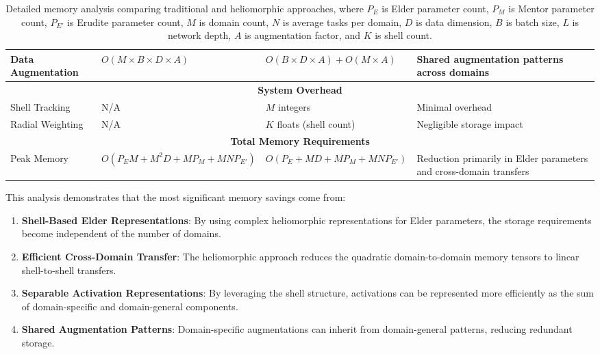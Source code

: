 \begin{table}[h]
\begin{tabular}{|p{3.5cm}|p{3.5cm}|p{3.5cm}|p{3.5cm}|}
\hline
Data Augmentation & $O(M \times B \times D \times A)$ & $O(B \times D \times A) + O(M \times A)$ & Shared augmentation patterns across domains \\
\hline
\multicolumn{4}{|c|}{\textbf{System Overhead}} \\
\hline
Shell Tracking & N/A & $M$ integers & Minimal overhead \\
\hline
Radial Weighting & N/A & $K$ floats (shell count) & Negligible storage impact \\
\hline
\multicolumn{4}{|c|}{\textbf{Total Memory Requirements}} \\
\hline
Peak Memory & $O(P_E M + M^2 D + MP_M + MNP_{E'})$ & $O(P_E + MD + MP_M + MNP_{E'})$ & Reduction primarily in Elder parameters and cross-domain transfers \\
\hline
\end{tabular}
\caption{Detailed memory analysis comparing traditional and heliomorphic approaches, where $P_E$ is Elder parameter count, $P_M$ is Mentor parameter count, $P_{E'}$ is Erudite parameter count, $M$ is domain count, $N$ is average tasks per domain, $D$ is data dimension, $B$ is batch size, $L$ is network depth, $A$ is augmentation factor, and $K$ is shell count.}
\label{tab:memory_analysis}
\end{table}

This analysis demonstrates that the most significant memory savings come from:

\begin{enumerate}
    \item \textbf{Shell-Based Elder Representations}: By using complex heliomorphic representations for Elder parameters, the storage requirements become independent of the number of domains.
    
    \item \textbf{Efficient Cross-Domain Transfer}: The heliomorphic approach reduces the quadratic domain-to-domain memory tensors to linear shell-to-shell transfers.
    
    \item \textbf{Separable Activation Representations}: By leveraging the shell structure, activations can be represented more efficiently as the sum of domain-specific and domain-general components.
    
    \item \textbf{Shared Augmentation Patterns}: Domain-specific augmentations can inherit from domain-general patterns, reducing redundant storage.
\end{enumerate}

